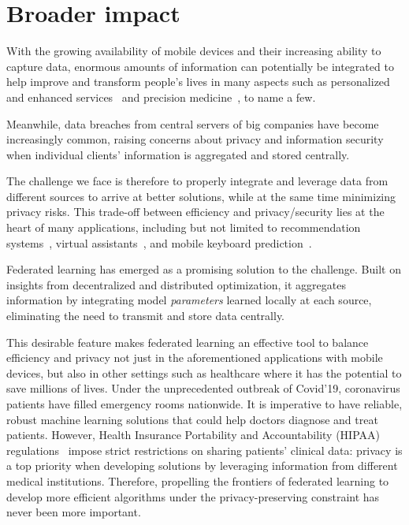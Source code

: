 
\section{Broader impact}
With the growing availability of mobile devices and their increasing ability to capture data, enormous amounts of information can potentially be integrated to help improve and transform people's lives in many aspects such as personalized and enhanced services~\cite{fallah2020personalized,47586} and precision medicine~\cite{uddin2019artificial,frohlich2018hype}, to name a few.

Meanwhile, data breaches from central servers of big companies have become increasingly common, raising concerns about privacy and information security when individual clients' information is aggregated and stored centrally. 

The challenge we face is therefore to properly integrate and leverage data from different sources to arrive at better solutions, while at the same time minimizing privacy risks. This trade-off between efficiency and privacy/security
lies at the heart of many applications, including 
but not limited to recommendation systems~\cite{chen2018federated}, virtual assistants~\cite{lamautonomy}, and mobile keyboard prediction~\cite{47586}.

Federated learning has emerged as a promising solution to the challenge. Built on insights from decentralized and distributed optimization, it aggregates information by integrating model \emph{parameters} learned locally at each source, eliminating the need to transmit and store data centrally. 

This desirable feature makes federated learning an effective tool to balance efficiency and privacy not just in the aforementioned applications with mobile devices, but also in other settings such as healthcare where it has the potential to save millions of lives. Under the unprecedented outbreak
of Covid'19, coronavirus patients have filled emergency rooms nationwide. It is imperative to have reliable, robust machine learning
solutions that could help doctors diagnose and treat patients. However,  Health Insurance Portability and Accountability (HIPAA) regulations~\cite{assistance2003summary}
impose strict restrictions on sharing patients' clinical data: privacy is a
top priority when developing solutions by leveraging information from different medical institutions. 
Therefore, propelling the frontiers of federated learning to develop more efficient 
algorithms under the privacy-preserving constraint has never been more
important.

